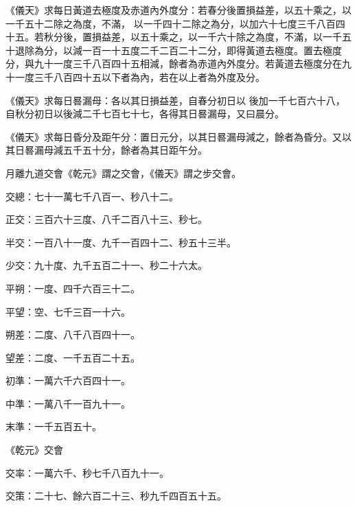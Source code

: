 \begin{pinyinscope}
 《儀天》求每日黃道去極度及赤道內外度分：若春分後置損益差，以五十乘之，以一千五十二除之為度，不滿，
 以一千四十二除之為分，以加六十七度三千八百四十五。若秋分後，置損益差，以五十乘之，以一千六十除之為度，不滿，以一千五十退除為分，以減一百一十五度二千二百二十二分，即得黃道去極度。置去極度分，與九十一度三千八百四十五相減，餘者為赤道內外度分。若黃道去極度分在九十一度三千八百四十五以下者為內，若在以上者為外度及分。



 《儀天》求每日晷漏母：各以其日損益差，自春分初日以
 後加一千七百六十八，自秋分初日以後減二千七百七十七，各得其日晷漏母，又曰晨分。



 《儀天》求每日昏分及距午分：置日元分，以其日晷漏母減之，餘者為昏分。又以其日晷漏母減五千五十分，餘者為其日距午分。



 月離九道交會《乾元》謂之交會，《儀天》謂之步交會。



 交總：七十一萬七千八百一、秒八十二。



 正交：三百六十三度、八千二百八十三、秒七。



 半交：一百八十一度、九千一百四十二、秒五十三半。



 少交：九十度、九千五百二十一、秒二十六太。



 平朔：一度、四千六百三十二。



 平望：空、七千三百一十六。



 朔差：二度、八千八百四十一。



 望差：二度、一千五百二十五。



 初準：一萬六千六百四十一。



 中準：一萬八千一百九十一。



 末準：一千五百五十。



 《乾元》交會



 交率：一萬六千、秒七千八百九十一。



 交策：二十七、餘六百二十三、秒九千四百五十五。




\end{pinyinscope}
